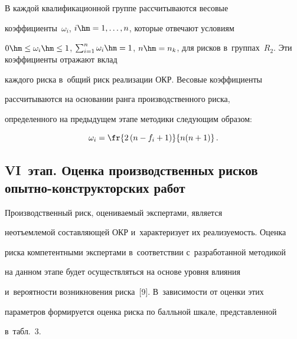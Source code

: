      


     В каждой квалификационной группе рассчитываются весовые 


коэффициенты~$\omega_i$, $i\hm= 1, \ldots , n$, которые отвечают условиям 


$0\hm\leq \omega_i\hm\leq 1$, $\sum\nolimits^n_{i=1} \omega_i\hm=1$, $n\hm= 


n_k$, для рисков в~группах~$R_2$. Эти коэффициенты отражают вклад 


каждого риска в~общий риск реализации ОКР. Весовые коэффициенты 


рассчитываются на основании ранга производственного риска, 


определенного на предыдущем этапе методики следующим образом: 


$$


\omega_i= \fr{2\left(n-f_i+1\right)}{n(n+1)}\,.


$$





\subsection*{VI~этап. Оценка производственных рисков опытно-конструкторских работ}





     Производственный риск, оцениваемый экспертами, является 


неотъемлемой составляющей ОКР и~характеризует их реализуемость. Оценка 


риска компетентными экспертами в~соответствии с~разработанной методикой 


на данном этапе будет осуществляться на основе уровня влияния 


и~вероятности возникновения риска~[9]. В~зависимости от оценки этих 


параметров формируется оценка риска по балльной шкале, представленной 


в~табл.~3.


     



